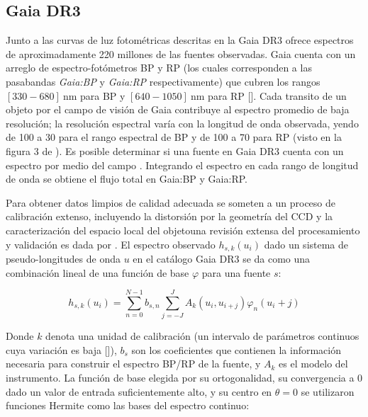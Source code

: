 \subsection{Gaia DR3}

Junto a las curvas de luz fotométricas descritas en la
 Gaia DR3 ofrece espectros de aproximadamente 220
millones de las fuentes observadas. Gaia cuenta con un arreglo de
espectro-fotómetros BP y RP (los cuales corresponden a las pasabandas
\textit{Gaia:BP} y \textit{Gaia:RP} respectivamente) que cubren los rangos $[330
- 680] \ \mathrm{nm}$ para BP y $[640 - 1050] \ \mathrm{nm}$ para RP
[].
Cada transito de un objeto por el campo de visión de Gaia contribuye al espectro
promedio de baja resolución; la resolución espectral varía con la longitud de
onda observada, yendo de 100 a 30 para el rango espectral de BP y de 100 a 70
para RP (visto en la figura 3 de
).
Es posible determinar si una fuente en Gaia DR3 cuenta con un espectro por medio
del campo . Integrando el espectro en cada rango de
longitud de onda se obtiene el flujo total en Gaia:BP y Gaia:RP.

Para obtener datos limpios de calidad adecuada se someten a un proceso de
calibración extenso, incluyendo la distorsión por la geometría del CCD y la
caracterización del espacio local del objeto\textemdash una revisión extensa del
procesamiento y validación es dada por
. El
espectro observado $h_{s,k}(u_i)$ dado un sistema de pseudo-longitudes de onda
$u$ en el catálogo Gaia DR3 se da como una combinación lineal de una función de
base $\varphi$ para una fuente $s$:

\begin{eqfloat}[!ht]
    \begin{equation}
        h_{s,k}(u_i) = \sum_{n=0}^{N - 1} b_{s,n} \sum_{j = -J}^{J} A_k(u_i, u_{i+j}) \varphi_n(u_i+j)
    \end{equation}
\end{eqfloat}

Donde $k$ denota una unidad de calibración (un intervalo de parámetros continuos
cuya variación es baja
[]),
$b_s$ son los coeficientes que contienen la información necesaria para construir
el espectro BP/RP de la fuente, y $A_k$ es el modelo del instrumento. La función
de base elegida por su ortogonalidad, su convergencia a 0 dado un valor de
entrada suficientemente alto, y su centro en $\theta = 0$ se utilizaron
funciones Hermite como las bases del espectro continuo:

